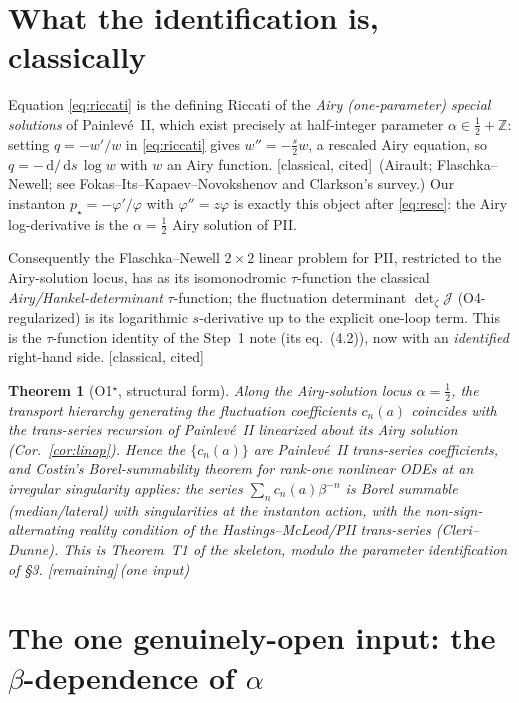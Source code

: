 \documentclass[11pt,reqno]{amsart}
\theoremstyle{plain}
\newtheorem{theorem}[proposition]{Theorem}
\theoremstyle{remark}
\newcommand{\dd}{\,\mathrm{d}}
\newcommand{\Z}{\mathbb{Z}}
\newcommand{\pinst}{p_\star}
\newcommand{\cited}{{\footnotesize\textsf{[classical, cited]}}}
\newcommand{\gap}{{\footnotesize\textsf{[remaining]}}}
\begin{document}
\section{What the identification is, classically}

Equation \eqref{eq:riccati} is the defining Riccati of the \emph{Airy (one-parameter) special
solutions} of Painlev\'e~II, which exist precisely at half-integer parameter $\alpha\in\tfrac12+\Z$:
setting $q=-w'/w$ in \eqref{eq:riccati} gives $w''=-\tfrac{s}{2}w$, a rescaled Airy equation, so
$q=-\dd/\dd s\,\log w$ with $w$ an Airy function. \cited\ (Airault; Flaschka--Newell; see
Fokas--Its--Kapaev--Novokshenov and Clarkson's survey.) Our instanton $\pinst=-\varphi'/\varphi$
with $\varphi''=z\varphi$ is exactly this object after \eqref{eq:resc}: the Airy log-derivative is
the $\alpha=\tfrac12$ Airy solution of PII.

Consequently the Flaschka--Newell $2\times2$ linear problem for PII, restricted to the Airy-solution
locus, has as its isomonodromic $\tau$-function the classical \emph{Airy/Hankel-determinant}
$\tau$-function; the fluctuation determinant $\det_\zeta\mathcal J$ (O4-regularized) is its
logarithmic $s$-derivative up to the explicit one-loop term. This is the $\tau$-function identity
of the Step~1 note (its eq.~(4.2)), now with an \emph{identified} right-hand side. \cited

\begin{theorem}[O1$^\star$, structural form]\label{thm:o1star}
Along the Airy-solution locus $\alpha=\tfrac12$, the transport hierarchy generating the
fluctuation coefficients $c_n(a)$ coincides with the trans-series recursion of Painlev\'e~II
linearized about its Airy solution (Cor.~\ref{cor:linop}). Hence the $\{c_n(a)\}$ are Painlev\'e~II
trans-series coefficients, and Costin's Borel-summability theorem for rank-one nonlinear ODEs at an
irregular singularity applies: the series $\sum_n c_n(a)\beta^{-n}$ is Borel summable
(median/lateral) with singularities at the instanton action, with the non-sign-alternating reality
condition of the Hastings--McLeod/PII trans-series (Cleri--Dunne). This is Theorem~T1 of the
skeleton, \emph{modulo} the parameter identification of \S3. \gap\,(one input)
\end{theorem}

\section{The one genuinely-open input: the $\beta$-dependence of $\alpha$}
\end{document}
